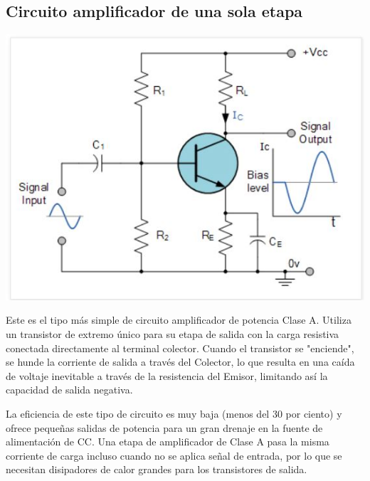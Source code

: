\documentclass[12pt,a4paper]{article}
\begin{document}
\subsection{Circuito amplificador de una sola etapa}
\includegraphics[scale=1]{imagenes/c1.JPG} 
\begin{flushleft}
Este es el tipo más simple de circuito amplificador de potencia Clase A. Utiliza un transistor de extremo único para su etapa de salida con la carga resistiva conectada directamente al terminal colector. Cuando el transistor se "enciende", se hunde la corriente de salida a través del Colector, lo que resulta en una caída de voltaje inevitable a través de la resistencia del Emisor, limitando así la capacidad de salida negativa.\linebreak

La eficiencia de este tipo de circuito es muy baja (menos del 30 por ciento) y ofrece pequeñas salidas de potencia para un gran drenaje en la fuente de alimentación de CC. Una etapa de amplificador de Clase A pasa la misma corriente de carga incluso cuando no se aplica señal de entrada, por lo que se necesitan disipadores de calor grandes para los transistores de salida.\\
\end{flushleft}
\newpage
\end{document}
